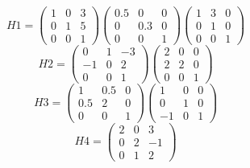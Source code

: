 \begin{equation}
 H1 =
 \begin{pmatrix}
   1 & 0 & 3\\ 0 & 1 & 5\\ 0 & 0 & 1
 \end{pmatrix}
 \begin{pmatrix}
   0.5 & 0 & 0\\ 0 & 0.3 & 0\\ 0 & 0 & 1
 \end{pmatrix}
 \begin{pmatrix}
   1 & 3 & 0\\ 0 & 1 & 0\\ 0 & 0 & 1
 \end{pmatrix}
 \end{equation}
 \begin{equation}
 H2  =
 \begin{pmatrix}
   0 & 1 & -3\\ -1 & 0 & 2\\ 0 & 0 & 1
 \end{pmatrix}
 \begin{pmatrix}
   2 & 0 & 0\\ 2 & 2 & 0\\ 0 & 0 & 1
 \end{pmatrix}
\end{equation}
\begin{equation}
 H3  =
 \begin{pmatrix}
   1 & 0.5 & 0\\ 0.5 & 2 & 0\\ 0 & 0 & 1
 \end{pmatrix}
 \begin{pmatrix}
   1 & 0 & 0\\ 0 & 1 & 0\\ -1 & 0 & 1
 \end{pmatrix}
 \end{equation}
 \begin{equation}
 H4  =
 \begin{pmatrix}
   2 & 0 & 3\\ 0 & 2 & -1\\ 0 & 1 & 2
 \end{pmatrix}
\end{equation}

